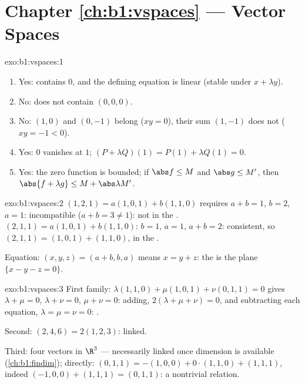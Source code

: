 \section*{Chapter \ref{ch:b1:vspaces} --- Vector Spaces}

\begin{solution}{exo:b1:vspaces:1}
\begin{enumerate}
  \item Yes: contains $0$, and the defining equation is linear
        (stable under $x + \lambda y$).
  \item No: does not contain $(0,0,0)$.
  \item No: $(1, 0)$ and $(0, -1)$ belong ($xy = 0$), their sum $(1,
        -1)$ does not ($xy = -1 < 0$).
  \item Yes: $0$ vanishes at $1$; $(P + \lambda Q)(1) = P(1) +
        \lambda Q(1) = 0$.
  \item Yes: the zero function is bounded; if $\abs f \leq M$ and
        $\abs g \leq M'$, then $\abs{f + \lambda g} \leq M +
        \abs\lambda M'$.
\end{enumerate}
\end{solution}

\begin{solution}{exo:b1:vspaces:2}
$(1,2,1) = a(1,0,1) + b(1,1,0)$ requires $a + b = 1$, $b = 2$, $a =
1$: incompatible ($a + b = 3 \neq 1$): not in the . $(2,1,1) =
a(1,0,1) + b(1,1,0)$: $b = 1$, $a = 1$, $a + b = 2$: consistent, so
$(2,1,1) = (1,0,1) + (1,1,0)$, in the .

Equation: $(x, y, z) = (a + b, b, a)$ means $x = y + z$: the  is
the plane $\{x - y - z = 0\}$.
\end{solution}

\begin{solution}{exo:b1:vspaces:3}
First family: $\lambda(1,1,0) + \mu(1,0,1) + \nu(0,1,1) = 0$ gives
$\lambda + \mu = 0$, $\lambda + \nu = 0$, $\mu + \nu = 0$: adding,
$2(\lambda + \mu + \nu) = 0$, and subtracting each equation,
$\lambda = \mu = \nu = 0$: .

Second: $(2,4,6) = 2(1,2,3)$: linked.

Third: four vectors in $\R^3$ --- necessarily linked once dimension
is available (\cref{ch:b1:findim}); directly: $(0,1,1) = -(1,0,0) +
0\cdot(1,1,0) + (1,1,1)$, indeed $(-1,0,0) + (1,1,1) = (0,1,1)$: a
nontrivial relation.
\end{solution}

